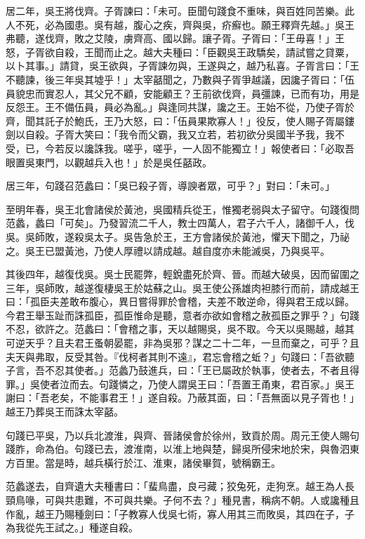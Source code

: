\begin{pinyinscope}
居二年，吳王將伐齊。子胥諫曰：「未可。臣聞句踐食不重味，與百姓同苦樂。此人不死，必為國患。吳有越，腹心之疾，齊與吳，疥癬也。願王釋齊先越。」吳王弗聽，遂伐齊，敗之艾陵，虜齊高、國以歸。讓子胥。子胥曰：「王毋喜！」王怒，子胥欲自殺，王聞而止之。越大夫種曰：「臣觀吳王政驕矣，請試嘗之貸粟，以卜其事。」請貸，吳王欲與，子胥諫勿與，王遂與之，越乃私喜。子胥言曰：「王不聽諫，後三年吳其墟乎！」太宰嚭聞之，乃數與子胥爭越議，因讒子胥曰：「伍員貌忠而實忍人，其父兄不顧，安能顧王？王前欲伐齊，員彊諫，已而有功，用是反怨王。王不備伍員，員必為亂。」與逢同共謀，讒之王。王始不從，乃使子胥於齊，聞其託子於鮑氏，王乃大怒，曰：「伍員果欺寡人！」役反，使人賜子胥屬鏤劍以自殺。子胥大笑曰：「我令而父霸，我又立若，若初欲分吳國半予我，我不受，已，今若反以讒誅我。嗟乎，嗟乎，一人固不能獨立！」報使者曰：「必取吾眼置吳東門，以觀越兵入也！」於是吳任嚭政。

居三年，句踐召范蠡曰：「吳已殺子胥，導諛者眾，可乎？」對曰：「未可。」

至明年春，吳王北會諸侯於黃池，吳國精兵從王，惟獨老弱與太子留守。句踐復問范蠡，蠡曰「可矣」。乃發習流二千人，教士四萬人，君子六千人，諸御千人，伐吳。吳師敗，遂殺吳太子。吳告急於王，王方會諸侯於黃池，懼天下聞之，乃祕之。吳王已盟黃池，乃使人厚禮以請成越。越自度亦未能滅吳，乃與吳平。

其後四年，越復伐吳。吳士民罷弊，輕銳盡死於齊、晉。而越大破吳，因而留圍之三年，吳師敗，越遂復棲吳王於姑蘇之山。吳王使公孫雄肉袒膝行而前，請成越王曰：「孤臣夫差敢布腹心，異日嘗得罪於會稽，夫差不敢逆命，得與君王成以歸。今君王舉玉趾而誅孤臣，孤臣惟命是聽，意者亦欲如會稽之赦孤臣之罪乎？」句踐不忍，欲許之。范蠡曰：「會稽之事，天以越賜吳，吳不取。今天以吳賜越，越其可逆天乎？且夫君王蚤朝晏罷，非為吳邪？謀之二十二年，一旦而棄之，可乎？且夫天與弗取，反受其咎。『伐柯者其則不遠』，君忘會稽之蚯？」句踐曰：「吾欲聽子言，吾不忍其使者。」范蠡乃鼓進兵，曰：「王已屬政於執事，使者去，不者且得罪。」吳使者泣而去。句踐憐之，乃使人謂吳王曰：「吾置王甬東，君百家。」吳王謝曰：「吾老矣，不能事君王！」遂自殺。乃蔽其面，曰：「吾無面以見子胥也！」越王乃葬吳王而誅太宰嚭。

句踐已平吳，乃以兵北渡淮，與齊、晉諸侯會於徐州，致貢於周。周元王使人賜句踐胙，命為伯。句踐已去，渡淮南，以淮上地與楚，歸吳所侵宋地於宋，與魯泗東方百里。當是時，越兵橫行於江、淮東，諸侯畢賀，號稱霸王。

范蠡遂去，自齊遺大夫種書曰：「蜚鳥盡，良弓藏；狡兔死，走狗烹。越王為人長頸鳥喙，可與共患難，不可與共樂。子何不去？」種見書，稱病不朝。人或讒種且作亂，越王乃賜種劍曰：「子教寡人伐吳七術，寡人用其三而敗吳，其四在子，子為我從先王試之。」種遂自殺。


\end{pinyinscope}
